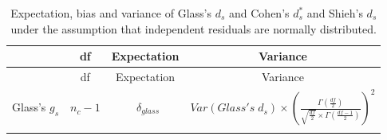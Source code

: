 \documentclass[
  english,
  man,floatsintext]{apa6}
\begin{document}
\newpage
\begin{landscape}

\begin{longtable}[]{@{}lccc@{}}
\caption{Expectation, bias and variance of Glass's \(d_s\) and Cohen's \(d^*_s\) and Shieh's \(d_s\) under the assumption that independent residuals are normally distributed.}\tabularnewline
\toprule
\begin{minipage}[b]{0.10\columnwidth}\raggedright
\strut
\end{minipage} & \begin{minipage}[b]{0.18\columnwidth}\centering
df\strut
\end{minipage} & \begin{minipage}[b]{0.16\columnwidth}\centering
Expectation\strut
\end{minipage} & \begin{minipage}[b]{0.45\columnwidth}\centering
Variance\strut
\end{minipage}\tabularnewline
\midrule
\endfirsthead
\toprule
\begin{minipage}[b]{0.10\columnwidth}\raggedright
\strut
\end{minipage} & \begin{minipage}[b]{0.18\columnwidth}\centering
df\strut
\end{minipage} & \begin{minipage}[b]{0.16\columnwidth}\centering
Expectation\strut
\end{minipage} & \begin{minipage}[b]{0.45\columnwidth}\centering
Variance\strut
\end{minipage}\tabularnewline
\midrule
\endhead
\begin{minipage}[t]{0.10\columnwidth}\raggedright
Glass's \(g_s\)\strut
\end{minipage} & \begin{minipage}[t]{0.18\columnwidth}\centering
\(n_c-1\)\strut
\end{minipage} & \begin{minipage}[t]{0.16\columnwidth}\centering
~\(\delta_{glass}\)\strut
\end{minipage} & \begin{minipage}[t]{0.45\columnwidth}\centering
\(Var(Glass's \; d_s) \times \left( \frac{\Gamma\left(\frac{df}{2} \right)}{\sqrt{\frac{df}{2}} \times \Gamma \left( \frac{df-1}{2}\right)}\right)^2\)\strut
\end{minipage}\tabularnewline
\begin{minipage}[t]{0.10\columnwidth}\raggedright

\end{minipage}
\end{longtable}
\end{landscape}
\end{document}
